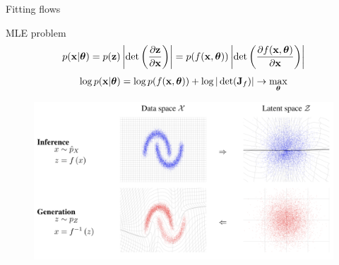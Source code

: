 \begin{frame}{Fitting flows}
	\begin{block}{MLE problem}
		\vspace{-0.3cm}
		\[
		p(\mathbf{x}|\boldsymbol{\theta}) = p(\mathbf{z}) \left|\det \left(  \frac{\partial \mathbf{z}}{\partial \mathbf{x}} \right) \right|  = p(f(\mathbf{x}, \boldsymbol{\theta})) \left|\det \left( \frac{\partial f(\mathbf{x}, \boldsymbol{\theta})}{\partial \mathbf{x}} \right) \right|
		\]
		\[
		\log p(\mathbf{x}|\boldsymbol{\theta}) = \log p(f(\mathbf{x}, \boldsymbol{\theta})) + \log  |\det (\mathbf{J}_f) | \rightarrow \max_{\boldsymbol{\theta}}
		\]
	\end{block}
	\vspace{-0.2cm}
	\begin{figure}
		\includegraphics[width=0.85\linewidth]{figs/flows_how2}
	\end{figure}
\end{frame}
